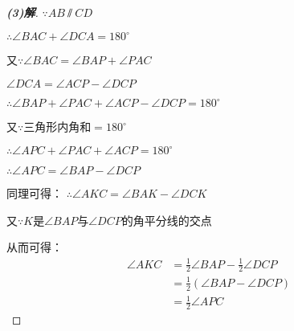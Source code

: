 \documentclass{ctexart}
\begin{document}
\begin{proof}[\textbf{(3)解}]
  $\because AB \varparallel CD$

  $\therefore \angle BAC + \angle DCA = 180^\circ$

  又$\because \angle BAC = \angle BAP + \angle PAC$
  
  $\angle DCA = \angle ACP - \angle DCP$

  $\therefore \angle BAP + \angle PAC + \angle ACP - \angle DCP = 180^\circ$

  又$\because$三角形内角和$=180^\circ$
  
  $\therefore \angle APC + \angle PAC + \angle ACP = 180^\circ$

  $\therefore \angle APC = \angle BAP - \angle DCP$

  同理可得：
  $\therefore \angle AKC = \angle BAK - \angle DCK$
  
  又$\because K$是$\angle BAP$与$\angle DCP$的角平分线的交点

  从而可得：
  \begin{align*}
    \angle AKC & = \frac{1}{2}\angle BAP - \frac{1}{2}\angle DCP \\
               & = \frac{1}{2}\left(\angle BAP - \angle DCP\right) \\
               & = \frac{1}{2}\angle APC                 
  \end{align*}  
\end{proof}

        
        
  
\end{document}
